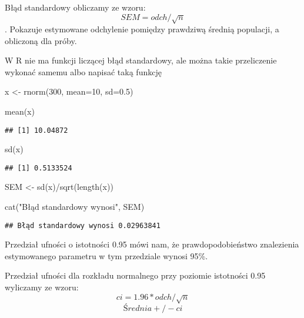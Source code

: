 \documentclass[
]{book}
\newenvironment{Shaded}{\begin{snugshade}}{\end{snugshade}}
\newcommand{\AttributeTok}[1]{\textcolor[rgb]{0.77,0.63,0.00}{#1}}
\newcommand{\DecValTok}[1]{\textcolor[rgb]{0.00,0.00,0.81}{#1}}
\newcommand{\FloatTok}[1]{\textcolor[rgb]{0.00,0.00,0.81}{#1}}
\newcommand{\FunctionTok}[1]{\textcolor[rgb]{0.00,0.00,0.00}{#1}}
\newcommand{\NormalTok}[1]{#1}
\newcommand{\OtherTok}[1]{\textcolor[rgb]{0.56,0.35,0.01}{#1}}
\newcommand{\SpecialCharTok}[1]{\textcolor[rgb]{0.00,0.00,0.00}{#1}}
\newcommand{\StringTok}[1]{\textcolor[rgb]{0.31,0.60,0.02}{#1}}
\begin{document}
Błąd standardowy obliczamy ze wzoru: \[SEM= odch/\sqrt{n}\]. Pokazuje estymowane odchylenie pomiędzy prawdziwą średnią populacji, a obliczoną dla próby.

W R nie ma funkcji liczącej błąd standardowy, ale można takie przeliczenie wykonać samemu albo napisać taką funkcję

\begin{Shaded}
\begin{Highlighting}[]
\NormalTok{x }\OtherTok{\textless{}{-}} \FunctionTok{rnorm}\NormalTok{(}\DecValTok{300}\NormalTok{, }\AttributeTok{mean=}\DecValTok{10}\NormalTok{, }\AttributeTok{sd=}\FloatTok{0.5}\NormalTok{)}

\FunctionTok{mean}\NormalTok{(x)}
\end{Highlighting}
\end{Shaded}

\begin{verbatim}
## [1] 10.04872
\end{verbatim}

\begin{Shaded}
\begin{Highlighting}[]
\FunctionTok{sd}\NormalTok{(x)}
\end{Highlighting}
\end{Shaded}

\begin{verbatim}
## [1] 0.5133524
\end{verbatim}

\begin{Shaded}
\begin{Highlighting}[]
\NormalTok{SEM }\OtherTok{\textless{}{-}} \FunctionTok{sd}\NormalTok{(x)}\SpecialCharTok{/}\FunctionTok{sqrt}\NormalTok{(}\FunctionTok{length}\NormalTok{(x))}

\FunctionTok{cat}\NormalTok{(}\StringTok{"Błąd standardowy wynosi"}\NormalTok{, SEM)}
\end{Highlighting}
\end{Shaded}

\begin{verbatim}
## Błąd standardowy wynosi 0.02963841
\end{verbatim}

Przedział ufności o istotności 0.95 mówi nam, że prawdopodobieństwo znalezienia estymowanego parametru w tym przedziale wynosi 95\%.

Przedział ufności dla rozkładu normalnego przy poziomie istotności 0.95 wyliczamy ze wzoru:
\[ci= 1.96*odch/\sqrt{n}\]
\[Średnia +/- ci\]
\end{document}
